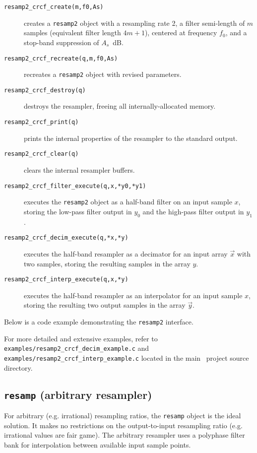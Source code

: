 \begin{description}
\item[{\tt resamp2\_crcf\_create(m,f0,As)}]
    creates a {\tt resamp2} object with a resampling rate 2,
    a filter semi-length of $m$ samples
    (equivalent filter length $4m+1$),
    centered at frequency $f_0$, and
    a stop-band suppression of $A_s$~dB.
\item[{\tt resamp2\_crcf\_recreate(q,m,f0,As)}]
    recreates a {\tt resamp2} object with revised parameters.
\item[{\tt resamp2\_crcf\_destroy(q)}]
    destroys the resampler, freeing all internally-allocated memory.
\item[{\tt resamp2\_crcf\_print(q)}]
    prints the internal properties of the resampler to the standard
    output.
\item[{\tt resamp2\_crcf\_clear(q)}]
    clears the internal resampler buffers.
\item[{\tt resamp2\_crcf\_filter\_execute(q,x,*y0,*y1)}]
    executes the {\tt resamp2} object as a half-band filter on an input
    sample $x$, storing the low-pass filter output in $y_0$ and the
    high-pass filter output in $y_1$.
\item[{\tt resamp2\_crcf\_decim\_execute(q,*x,*y)}]
    executes the half-band resampler as a decimator
    for an input array $\vec{x}$ with two samples,
    storing the resulting samples in the array $y$.
\item[{\tt resamp2\_crcf\_interp\_execute(q,x,*y)}]
    executes the half-band resampler as an interpolator
    for an input sample $x$,
    storing the resulting two output samples in the array $\vec{y}$.
\end{description}
%
Below is a code example demonstrating the {\tt resamp2} interface.
%

%
For more detailed and extensive examples, refer to
{\tt examples/resamp2\_crcf\_decim\_example.c} and
{\tt examples/resamp2\_crcf\_interp\_example.c}
located in the main \liquid\ project source directory.


% 
%
\subsection{{\tt resamp} (arbitrary resampler)}
\label{module:filter:resamp}
For arbitrary (e.g. irrational) resampling ratios, the {\tt resamp}
object is the ideal solution.
It makes no restrictions on the output-to-input resampling ratio
(e.g. irrational values are fair game).
The arbitrary resampler uses a polyphase filter bank for interpolation
between available input sample points.

